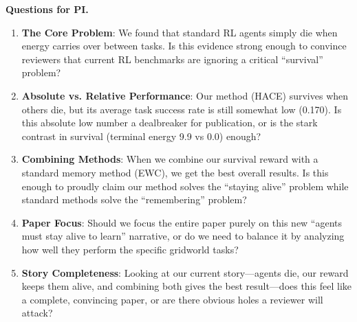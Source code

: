 \documentclass[11pt]{article}
\begin{document}
\textbf{Questions for PI.}
\begin{enumerate}[leftmargin=*, itemsep=1pt, topsep=2pt]
\item \textbf{The Core Problem}: We found that standard RL agents simply die when energy carries over between tasks. Is this evidence strong enough to convince reviewers that current RL benchmarks are ignoring a critical ``survival'' problem?
\item \textbf{Absolute vs. Relative Performance}: Our method (HACE) survives when others die, but its average task success rate is still somewhat low (0.170). Is this absolute low number a dealbreaker for publication, or is the stark contrast in survival (terminal energy 9.9 vs 0.0) enough?
\item \textbf{Combining Methods}: When we combine our survival reward with a standard memory method (EWC), we get the best overall results. Is this enough to proudly claim our method solves the ``staying alive'' problem while standard methods solve the ``remembering'' problem?
\item \textbf{Paper Focus}: Should we focus the entire paper purely on this new ``agents must stay alive to learn'' narrative, or do we need to balance it by analyzing how well they perform the specific gridworld tasks?
\item \textbf{Story Completeness}: Looking at our current story---agents die, our reward keeps them alive, and combining both gives the best result---does this feel like a complete, convincing paper, or are there obvious holes a reviewer will attack?
\end{enumerate}
\end{document}
